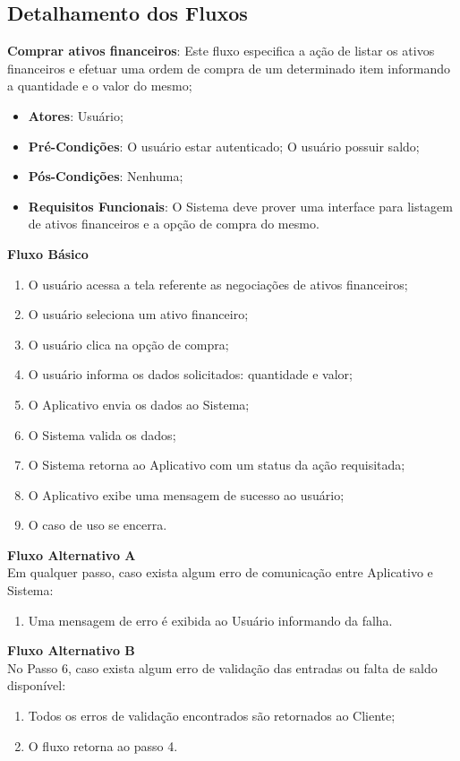 \subsection*{Detalhamento dos Fluxos}
\begin{lista}
  \item \textbf{Comprar ativos financeiros}: Este fluxo especifica a ação de listar os ativos financeiros e efetuar uma ordem de compra de um determinado item informando a quantidade e o valor do mesmo;
    \begin{itemize}
    \item \textbf{Atores}: Usuário;
    \item \textbf{Pré-Condições}: O usuário estar autenticado; O usuário possuir saldo;
    \item \textbf{Pós-Condições}: Nenhuma;
    \item \textbf{Requisitos Funcionais}: O Sistema deve prover uma interface para listagem de ativos financeiros e a opção de compra do mesmo.
    \end{itemize}
	
    \textbf{Fluxo Básico}
    \begin{enumerate}
    \item O usuário acessa a tela referente as negociações de ativos financeiros;
    \item O usuário seleciona um ativo financeiro;
    \item O usuário clica na opção de compra;
    \item O usuário informa os dados solicitados: quantidade e valor;
    \item O Aplicativo envia os dados ao Sistema;
    \item O Sistema valida os dados;
    \item O Sistema retorna ao Aplicativo com um status da ação requisitada;
    \item O Aplicativo exibe uma mensagem de sucesso ao usuário;
    \item O caso de uso se encerra.
    \end{enumerate}
    
    \textbf{Fluxo Alternativo A} \\
    Em qualquer passo, caso exista algum erro de comunicação entre Aplicativo e Sistema:
    \begin{enumerate}
    \item Uma mensagem de erro é exibida ao Usuário informando da falha.
    \end{enumerate}
    
    \textbf{Fluxo Alternativo B} \\
    No Passo 6, caso exista algum erro de validação das entradas ou falta de saldo disponível:
    \begin{enumerate}
    \item Todos os erros de validação encontrados são retornados ao Cliente;
    \item O fluxo retorna ao passo 4.
    \end{enumerate}
  
  
\end{lista}

